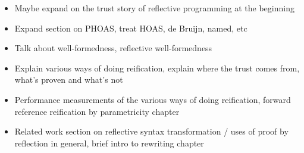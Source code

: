 \begin{itemize}
\item Maybe expand on the trust story of reflective programming at the beginning
\item Expand section on PHOAS, treat HOAS, de Bruijn, named, etc
\item Talk about well-formedness, reflective well-formedness
\item Explain various ways of doing reification, explain where the trust comes from, what's proven and what's not
\item Performance measurements of the various ways of doing reification, forward reference reification by parametricity chapter
\item Related work section on reflective syntax transformation / uses of proof by reflection in general, brief intro to rewriting chapter
\end{itemize}


